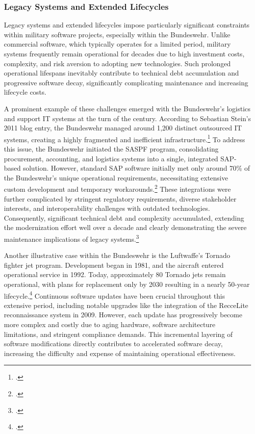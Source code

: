 \subsubsection{Legacy Systems and Extended Lifecycles}
Legacy systems and extended lifecycles impose particularly significant constraints within military software projects, especially within the Bundeswehr. 
Unlike commercial software, which typically operates for a limited period, military systems frequently remain operational for decades due to high investment costs, complexity, and risk aversion to adopting new technologies. Such prolonged operational 
lifespans inevitably contribute to technical debt accumulation and progressive software decay, significantly complicating maintenance and increasing lifecycle costs.

A prominent example of these challenges emerged with the Bundeswehr's logistics and support IT systems at the turn of the century. According to Sebastian Stein's 2011 blog entry,
 the Bundeswehr managed around 1,200 distinct outsourced IT systems, creating a highly fragmented and inefficient infrastructure.\footcite{steinBusinessProcessManagement2011} To address this issue, the Bundeswehr initiated the \ac{SASPF} program, consolidating procurement, accounting, 
 and logistics systems into a single, integrated SAP-based solution. However, standard SAP software initially met only around 70\% of the Bundeswehr's unique operational requirements, necessitating extensive custom development and temporary workarounds.\footcite{steinBusinessProcessManagement2011} These integrations were further 
 complicated by stringent regulatory requirements, diverse stakeholder interests, and interoperability challenges with outdated technologies. Consequently, significant technical debt and complexity accumulated, extending the modernization effort well over a decade and clearly demonstrating the severe maintenance implications of legacy systems.\footcite{steinBusinessProcessManagement2011}

Another illustrative case within the Bundeswehr is the Luftwaffe's Tornado fighter jet program. Development began in 1981, and the aircraft entered operational service in 1992. Today, approximately 80 Tornado jets remain operational, with plans for 
replacement only by 2030 resulting in a nearly 50-year lifecycle.\footcite{skibaTornado50Jahre2024} Continuous software updates have been crucial throughout this extensive period, including notable upgrades like the integration of the RecceLite reconnaissance system in 2009. However, 
each update has progressively become more complex and costly due to aging hardware, software architecture limitations, and stringent compliance demands. This incremental layering of software modifications directly contributes to accelerated software decay, increasing the difficulty and expense of maintaining operational effectiveness.

